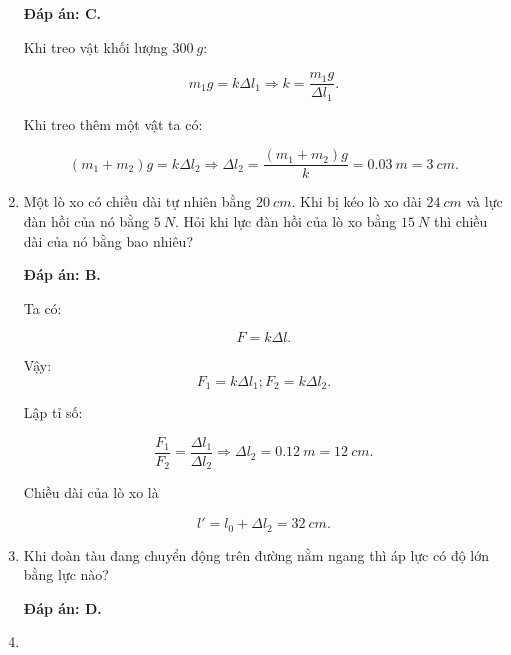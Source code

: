 \begin{enumerate}[label=\bfseries Câu \arabic*:]
	\hideall
	{	
		\textbf{Đáp án: C.}
		
		Khi treo vật khối lượng $\SI{300}{g}$:
		
		$$m_1g = k\Delta l_1 \Rightarrow k = \dfrac{m_1 g}{\Delta l_1}.$$
		
		Khi treo thêm một vật ta có:
		
		$$(m_1+m_2)g = k\Delta l_2 \Rightarrow \Delta l_2 = \dfrac{(m_1+m_2)g}{k} = \SI{0,03}{m} = \SI{3}{cm}.$$
	}
	\item {}
	
	
	{Một lò xo có chiều dài tự nhiên bằng $\SI{20}{cm}$. Khi bị kéo lò xo dài $\SI{24}{cm}$ và lực đàn hồi của nó bằng $\SI{5}{N}$. Hỏi khi lực đàn hồi của lò xo bằng $\SI{15}{N}$ thì chiều dài của nó bằng bao nhiêu?
		
	}
	
	\hideall
	{	
		\textbf{Đáp án: B.}
		
			Ta có:
		
		$$F = k \Delta l.$$
		
		Vậy: 
		$$F_1 = k \Delta l_1; F_2 = k \Delta l_2.$$
		
		Lập tỉ số:
		
		$$\dfrac{F_1}{F_2} = \dfrac{\Delta l_1}{\Delta l_2} \Rightarrow \Delta l_2 = \SI{0,12}{m} = \SI{12}{cm}.$$
		
		Chiều dài của lò xo là
		
		$$l' = l_0 + \Delta l_2 = \SI{32}{cm}.$$
	}
	\item {}
	
	
	{
		Khi đoàn tàu đang chuyển động trên đường nằm ngang thì áp lực có độ lớn bằng lực nào?
	}
	
	\hideall
	{	
		\textbf{Đáp án: D.}
	}
	\item {}
	

\end{enumerate}

